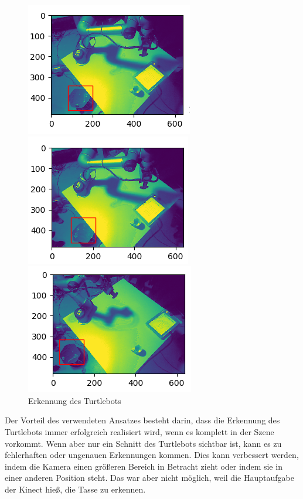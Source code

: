 \begin{figure}
\centering
\begin{minipage}[t]{.3\textwidth}
\centering
\vspace{0pt}
\includegraphics{./images/tb1.png}
\end{minipage}\hfill
\begin{minipage}[t]{.3\textwidth}
\centering
\vspace{0pt}
\includegraphics{./images/tb2.png}
\end{minipage}\hfill
\begin{minipage}[t]{.3\textwidth}
\centering
\vspace{0pt}
\includegraphics{./images/tb3.png}
\end{minipage}\hfill
\caption{Erkennung des Turtlebots}
\end{figure}
Der Vorteil des verwendeten Ansatzes besteht darin, dass die Erkennung des Turtlebots immer erfolgreich realisiert wird, wenn es komplett in der Szene vorkommt. Wenn aber nur ein Schnitt des Turtlebots sichtbar ist, kann es zu fehlerhaften oder ungenauen Erkennungen kommen. Dies kann verbessert werden, indem die Kamera einen größeren Bereich in Betracht zieht oder indem sie in einer anderen Position steht. Das war aber nicht möglich, weil die Hauptaufgabe der Kinect hieß, die Tasse zu erkennen.

